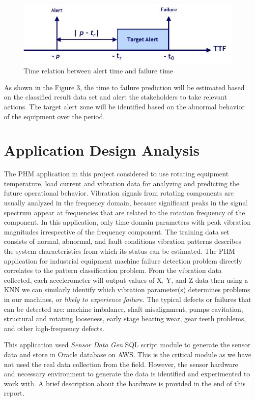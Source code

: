 \documentclass[sigconf]{acmart}
\begin{document}
\begin{figure}
\includegraphics[width=1.0\columnwidth]{images/ttf_1}
\caption{Time relation between alert time and failure time} \label{fig:Figure3}
\end{figure}

As shown in the Figure 3, the time to failure prediction will be estimated based on the classified result data set and alert the stakeholders to take relevant actions. The target alert zone will be identified based on the abnormal behavior of the equipment over the period.

\section{Application Design Analysis}
The PHM application in this project considered to use rotating equipment temperature, load current and vibration data for analyzing and predicting the future operational behavior. 
Vibration signals from rotating components are usually analyzed in the frequency domain, because significant peaks in the signal spectrum appear at frequencies that are related to the rotation frequency of the component. In this application, only time domain parameters with peak vibration magnitudes irrespective of the frequency component. The training data set consists of normal, abnormal, and fault conditions vibration patterns describes the system characteristics from which its status can be estimated.
The PHM application for industrial equipment machine failure detection problem directly correlates to the pattern classification problem. From the vibration data collected, each accelerometer will output values of X, Y, and Z data then using a KNN we can similarly identify which vibration parameter(s) determines problems in our machines, or \textit{likely to experience failure.} The typical defects or failures that can be detected are: machine imbalance, shaft misalignment, pumps cavitation, structural and rotating looseness, early stage bearing wear, gear teeth problems, and other high-frequency defects.

This application used \textit{Sensor Data Gen} SQL script module to generate the sensor data and store in Oracle database on AWS. This is the critical module as we have not used the real data collection from the field. However, the sensor hardware and necessary environment to generate the data is identified and experimented to work with. A brief description about the hardware is provided in the end of this report.
\end{document}

